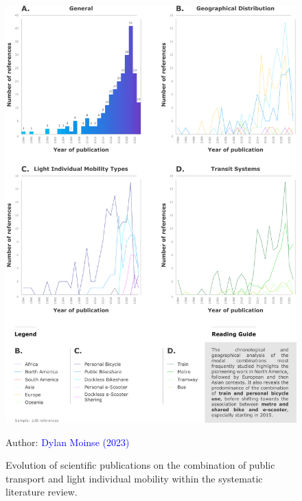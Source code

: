 \begin{refsegment}
    \begin{figure}[h!]\vspace*{4pt}
        \caption{Evolution of scientific publications on the combination of public transport and light individual mobility within the systematic literature review.}
        \label{fig-chap2:chronologie-modes-deplacements-rsl}
        \centerline{\includegraphics[width=1\columnwidth]{src/Figures/Chap-2/EN_RSL_Chronologie.pdf}}
        \vspace{5pt}
        \begin{flushright}\scriptsize{
        Author: \textcolor{blue}{Dylan Moinse (2023)}
        }\end{flushright}
    \end{figure}


\end{refsegment}
